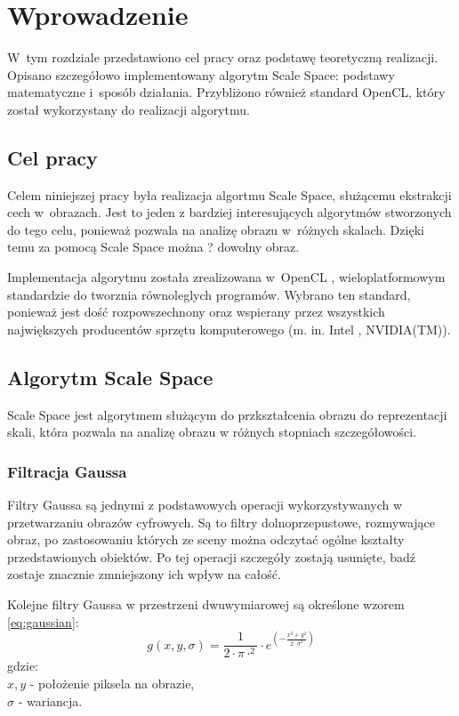 \chapter{Wprowadzenie}
\label{cha:wprowadzenie}

W~tym rozdziale przedstawiono cel pracy oraz podstawę teoretyczną realizacji. Opisano szczegółowo implementowany algorytm Scale Space: podstawy matematyczne i~sposób działania. Przybliżono również standard OpenCL, który został wykorzystany do realizacji algorytmu.


\section{Cel pracy}
\label{sec:cel}
Celem niniejszej pracy była realizacja algortmu Scale Space, służącemu ekstrakcji cech w~obrazach. Jest to jeden z bardziej interesujących algorytmów stworzonych do tego celu, ponieważ pozwala na analizę obrazu w~różnych skalach. Dzięki temu za pomocą Scale Space można ? dowolny obraz.

Implementacja algorytmu została zrealizowana w~OpenCL \cite{OpenCL}, wieloplatformowym standardzie do tworznia równoleglych programów. Wybrano ten standard, ponieważ jest dość rozpowszechnony oraz wspierany przez wszystkich największych producentów sprzętu komputerowego (m. in. Intel\textsuperscript{\textregistered} , NVIDIA(TM)).

\section{Algorytm Scale Space}
\label{sec:algorytm}
Scale Space jest algorytmem służącym do przkształcenia obrazu do reprezentacji skali, która pozwala na analizę obrazu w różnych stopniach szczegółowości.

\subsection{Filtracja Gaussa}
\label{subsec:filtracjaGaussa}
Filtry Gaussa są jednymi z podstawowych operacji wykorzystywanych w przetwarzaniu obrazów cyfrowych. Są to filtry dolnoprzepustowe, rozmywające obraz, po zastosowaniu których ze sceny można odczytać ogólne kształty przedstawionych obiektów. Po tej operacji szczegóły zostają usunięte, badź zostaje znacznie zmniejszony ich wpływ na całość.

Kolejne filtry Gaussa w przestrzeni dwuwymiarowej są określone wzorem \ref{eq:gaussian}:
\begin{equation}
\label{eq:gaussian}
g(x,y,\sigma)=\frac{1}{2 \cdot \pi \cdot ^ {2} }\cdot e^{(-\frac{x^{2} + y^{2}}{2 \cdot \sigma ^{2}})}
\end{equation}
gdzie:\\
$ x,y $ - położenie piksela na obrazie, \\
$ \sigma $ - wariancja.

